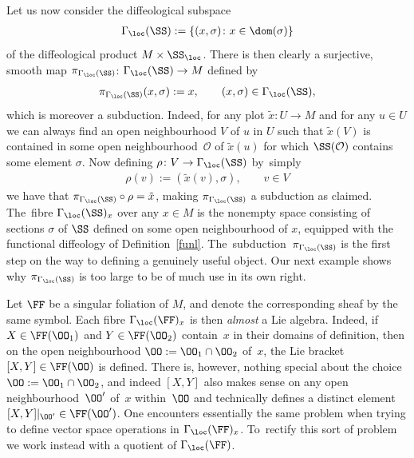 Let us now consider the diffeological subspace
\begin{gather*}
\Gamma_{\loc}(\SS):=\{(x,\sigma)\colon x\in\dom(\sigma)\}
\end{gather*}
of the diffeological product $M\times \SS_{\loc}$. There is then clearly a surjective, smooth map $\pi_{\Gamma_{\loc}(\SS)}$: $\Gamma_{\loc}(\SS)\rightarrow M$ defined by
\begin{gather*}
\pi_{\Gamma_{\loc}(\SS)}(x,\sigma):=x,\qquad (x,\sigma)\in\Gamma_{\loc}(\SS),
\end{gather*}
which is moreover a subduction. Indeed, for any plot $\tilde{x}\colon U\rightarrow M$ and for any $u\in U$ we can always find an open neighbourhood $V$ of $u$ in $U$ such that $\tilde{x}(V)$ is contained in some open neighbour\-hood~$\mathcal{O}$ of $\tilde{x}(u)$ for which $\SS(\mathcal{O})$ contains some element $\sigma$. Now defining $\rho\colon V\rightarrow \Gamma_{\loc}(\SS)$ by~simply
\begin{gather*}
\rho(v):=(\tilde{x}(v),\sigma),\qquad v\in V
\end{gather*}
we have that $\pi_{\Gamma_{\loc}(\SS)}\circ\rho = \tilde{x}$, making $\pi_{\Gamma_{\loc}(\SS)}$ a subduction as claimed. The~fibre $\Gamma_{\loc}(\SS)_{x}$ over any $x\in M$ is the nonempty space consisting of sections $\sigma$ of $\SS$ defined on some open neighbourhood of $x$, equipped with the functional diffeology of Definition~\ref{funl}. The~subduc\-tion~$\pi_{\Gamma_{\loc}(\SS)}$ is the first step on the way to defining a genuinely useful object. Our next example shows why $\pi_{\Gamma_{\loc}(\SS)}$ is too large to be of much use in its own right.

\begin{Example}\label{ex1}
Let $\FF$ be a singular foliation of $M$, and denote the corresponding sheaf by the same symbol. Each fibre $\Gamma_{\loc}(\FF)_{x}$ is then \textit{almost} a Lie algebra. Indeed, if~$X\in\FF(\OO_{1})$ and \mbox{$Y\in\FF(\OO_{2})$} contain~$x$ in their domains of definition, then on the open neighbourhood $\OO:=\OO_{1}\cap \OO_{2}$ of~$x$, the Lie bracket $[X,Y]\in\FF(\OO)$ is defined. There is, however, nothing special about the choice $\OO:=\OO_{1}\cap\OO_{2}$, and indeed $[X,Y]$ also makes sense on any open neighbourhood~$\OO'$ of~$x$ within~$\OO$ and technically defines a distinct element $[X,Y]|_{\OO'}\in\FF(\OO')$. One encounters essentially the same problem when trying to define vector space operations in $\Gamma_{\loc}(\FF)_{x}$. To~rectify this sort of problem we work instead with a quotient of $\Gamma_{\loc}(\FF)$.
\end{Example}

